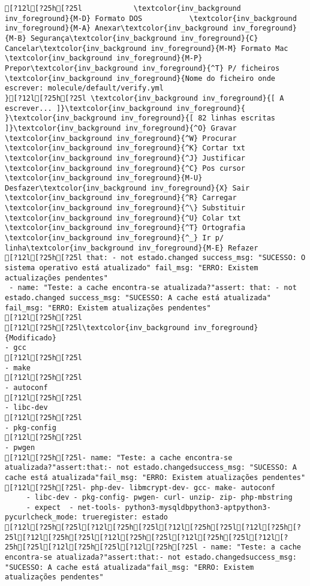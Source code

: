 \documentclass{scrartcl}
\begin{document}
\begin{Verbatim}
[?12l[?25h[?25l            \textcolor{inv_background inv_foreground}{M-D} Formato DOS           \textcolor{inv_background inv_foreground}{M-A} Anexar\textcolor{inv_background inv_foreground}{M-B} Segurança\textcolor{inv_background inv_foreground}{C} Cancelar\textcolor{inv_background inv_foreground}{M-M} Formato Mac           \textcolor{inv_background inv_foreground}{M-P} Prepor\textcolor{inv_background inv_foreground}{^T} P/ ficheiros
\textcolor{inv_background inv_foreground}{Nome do ficheiro onde escrever: molecule/default/verify.yml                                             }[?12l[?25h[?25l \textcolor{inv_background inv_foreground}{[ A escrever... ]}\textcolor{inv_background inv_foreground}{          }\textcolor{inv_background inv_foreground}{[ 82 linhas escritas ]}\textcolor{inv_background inv_foreground}{^O} Gravar     \textcolor{inv_background inv_foreground}{^W} Procurar   \textcolor{inv_background inv_foreground}{^K} Cortar txt \textcolor{inv_background inv_foreground}{^J} Justificar \textcolor{inv_background inv_foreground}{^C} Pos cursor \textcolor{inv_background inv_foreground}{M-U} Desfazer\textcolor{inv_background inv_foreground}{X} Sair       \textcolor{inv_background inv_foreground}{^R} Carregar   \textcolor{inv_background inv_foreground}{^\} Substituir \textcolor{inv_background inv_foreground}{^U} Colar txt  \textcolor{inv_background inv_foreground}{^T} Ortografia \textcolor{inv_background inv_foreground}{^_} Ir p/ linha\textcolor{inv_background inv_foreground}{M-E} Refazer
[?12l[?25h[?25l that: - not estado.changed success_msg: "SUCESSO: O sistema operativo está atualizado" fail_msg: "ERRO: Existem actualizações pendentes"
 - name: "Teste: a cache encontra-se atualizada?"assert: that: - not estado.changed success_msg: "SUCESSO: A cache está atualizada" fail_msg: "ERRO: Existem atualizações pendentes"
[?12l[?25h[?25l
[?12l[?25h[?25l\textcolor{inv_background inv_foreground}{Modificado}
- gcc
[?12l[?25h[?25l
- make
[?12l[?25h[?25l
- autoconf
[?12l[?25h[?25l
- libc-dev
[?12l[?25h[?25l
- pkg-config
[?12l[?25h[?25l
- pwgen
[?12l[?25h[?25l- name: "Teste: a cache encontra-se atualizada?"assert:that:- not estado.changedsuccess_msg: "SUCESSO: A cache está atualizada"fail_msg: "ERRO: Existem atualizações pendentes"
[?12l[?25h[?25l- php-dev- libmcrypt-dev- gcc- make- autoconf
     - libc-dev - pkg-config- pwgen- curl- unzip- zip- php-mbstring
     - expect  - net-tools- python3-mysqldbpython3-aptpython3-pycurlcheck_mode: trueregister: estado
[?12l[?25h[?25l[?12l[?25h[?25l[?12l[?25h[?25l[?12l[?25h[?25l[?12l[?25h[?25l[?12l[?25h[?25l[?12l[?25h[?25l[?12l[?25h[?25l[?12l[?25h[?25l[?12l[?25h[?25l - name: "Teste: a cache encontra-se atualizada?"assert:that:- not estado.changedsuccess_msg: "SUCESSO: A cache está atualizada"fail_msg: "ERRO: Existem atualizações pendentes"

\end{Verbatim}
\end{document}

